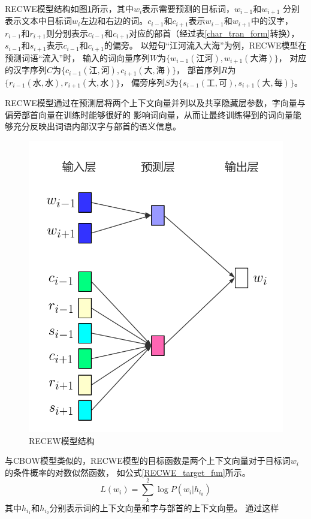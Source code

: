 RECWE模型结构如图\ref{RECWE}所示，其中$w_i$表示需要预测的目标词，$w_{i-1}$和$w_{i+1}$
分别表示文本中目标词$w_i$左边和右边的词。$c_{i-1}$和$c_{i+1}$表示$w_{i-1}$和$w_{i+1}$中的汉字，
$r_{i-1}$和$r_{i+1}$则分别表示$c_{i-1}$和$c_{i+1}$对应的部首（经过表\ref{char_tran_form}转换），
$s_{i-1}$和$s_{i+1}$表示$c_{i-1}$和$c_{i+1}$的偏旁。
以短句“江河流入大海”为例，RECWE模型在预测词语“流入”时，
输入的词向量序列$W$为$\{w_{i-1}(\mbox{江河}),w_{i+1}(\mbox{大海})\}$，
对应的汉字序列$C$为$\{c_{i-1}(\mbox{江},\mbox{河}),c_{i+1}(\mbox{大},\mbox{海})\}$，
部首序列$R$为$\{r_{i-1}(\mbox{水},\mbox{水}),r_{i+1}(\mbox{大},\mbox{水})\}$，
偏旁序列$S$为$\{s_{i-1}(\mbox{工},\mbox{可}),s_{i+1}(\mbox{大},\mbox{每})\}$。

RECWE模型通过在预测层将两个上下文向量并列以及共享隐藏层参数，字向量与偏旁部首向量在训练时能够很好的
影响词向量，从而让最终训练得到的词向量能够充分反映出词语内部汉字与部首的语义信息。
\begin{figure}[h]
    \includegraphics[scale=0.4]{picture/RECWE.png}
    \caption{RECEW模型结构}
    \label{RECWE}
\end{figure}

与CBOW模型类似的，RECWE模型的目标函数是两个上下文向量对于目标词$w_i$的条件概率的对数似然函数，
如公式\ref{RECWE_target_fun}所示。
\begin{equation}
    L\left ( w_i \right )= \sum_{k}^{2}\log P\left ( w_i | h_{i_k} \right )
    \label{RECWE_target_fun}
\end{equation}
其中$h_{i_1}$和$h_{i_2}$分别表示词的上下文向量和字与部首的上下文向量。
通过这样

